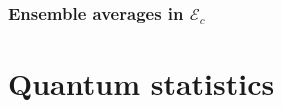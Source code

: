 \documentclass[letter-paper]{tufte-book}
\begin{document}

\subsection{Ensemble averages in $\mathcal{E}_c$}


\chapter{Quantum statistics}










\mainmatter




%


\end{document}
